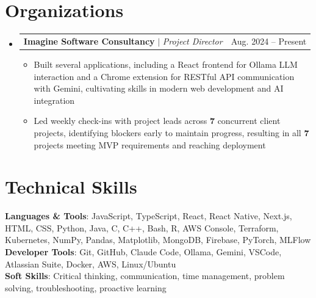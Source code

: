 \documentclass[letterpaper,11pt]{article}
\makeatletter
\newcommand{\resumeItem}[1]{
  \item\small{
    {#1 \vspace{-4pt}}
  }
}
\newcommand{\resumeProjectHeading}[2]{
    \item
    \begin{tabular*}{0.97\textwidth}{l@{\extracolsep{\fill}}r}
      \small#1 & #2 \\
    \end{tabular*}\vspace{-7pt}
}
\newcommand{\resumeSubHeadingListStart}{\begin{itemize}[leftmargin=0.15in, label={}]}
\newcommand{\resumeSubHeadingListEnd}{\end{itemize}}
\newcommand{\resumeItemListStart}{\begin{itemize}}
\newcommand{\resumeItemListEnd}{\end{itemize}\vspace{-5pt}}
\makeatother
\begin{document}
\section{Organizations}
  \resumeSubHeadingListStart
  
    \resumeProjectHeading
      {\textbf{Imagine Software Consultancy} $|$ \emph{Project Director}}{Aug. 2024 -- Present}
      \resumeItemListStart
        \resumeItem{Built several applications, including a React frontend for Ollama LLM interaction and a Chrome extension for RESTful API communication with Gemini, cultivating skills in modern web development and AI integration}
        \resumeItem{Led weekly check-ins with project leads across \textbf{7} concurrent client projects, identifying blockers early to maintain progress, resulting in all \textbf{7} projects meeting MVP requirements and reaching deployment}
      \resumeItemListEnd

 \resumeSubHeadingListEnd
 
%
\section{Technical Skills}
 \begin{itemize}[leftmargin=0.15in, label={}]
    \small{\item{
     \textbf{Languages \& Tools}{: JavaScript, TypeScript, React, React Native, Next.js, HTML, CSS, Python, Java, C, C++, Bash, R, AWS Console, Terraform, Kubernetes, NumPy, Pandas, Matplotlib, MongoDB, Firebase, PyTorch, MLFlow} \\
     \textbf{Developer Tools}{: Git, GitHub, Claude Code, Ollama, Gemini, VSCode, Atlassian Suite, Docker, AWS, Linux/Ubuntu} \\
     \textbf{Soft Skills}{: Critical thinking, communication, time management, problem solving, troubleshooting, proactive learning} \\
    }}
 \end{itemize}


\end{document}
